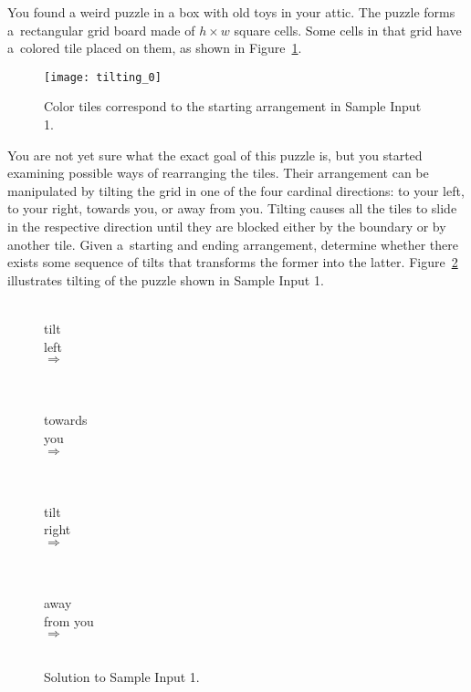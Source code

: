 
You found a weird puzzle in a box with old toys in your attic.
The puzzle forms a~rectangular grid board made of $h \times w$ square cells. 
Some cells in that grid have a~colored tile placed on them, as shown in Figure~\ref{fig:start}.

\begin{figure}[h]
\centering
\texttt{[image: tilting\_0]}
\caption{Color tiles correspond to the starting arrangement in Sample Input 1.}
\label{fig:start}
\end{figure}

You are not yet sure what the exact goal of this puzzle is, but you started examining possible ways of rearranging the tiles.
Their arrangement can be manipulated by tilting the grid in one of the four cardinal directions:
to your left, to your right, towards you, or away from you.
Tilting causes all the tiles to slide in the respective direction until they are blocked either by the boundary or by another tile.
Given a~starting and ending arrangement, determine whether there exists some sequence of tilts that transforms the former into the latter.
Figure~\ref{fig:tilt} illustrates tilting of the puzzle shown in Sample Input 1.

\begin{figure}[h]
\newcommand{\tiltfigln}{\vphantom{ly}\small}
\newlength{\tiltfigsp}\setlength{\tiltfigsp}{-4pt}
\centering
\parbox{0.4in}{\centering {\tiltfigln }\\[\tiltfigsp]{\tiltfigln tilt}\\[\tiltfigsp]{\tiltfigln left}\\$\Longrightarrow$\\~}
\parbox{0.5in}{\centering {\tiltfigln tilt}\\[\tiltfigsp]{\tiltfigln towards}\\[\tiltfigsp]{\tiltfigln you}\\$\Longrightarrow$\\~}
\parbox{0.4in}{\centering {\tiltfigln ~}\\[\tiltfigsp]{\tiltfigln tilt}\\[\tiltfigsp]{\tiltfigln right}\\$\Longrightarrow$\\~}
\parbox{0.55in}{\centering {\tiltfigln tilt}\\[\tiltfigsp]{\tiltfigln away}\\[\tiltfigsp]{\tiltfigln from you}\\$\Longrightarrow$\\~}
\caption{Solution to Sample Input 1.}
\label{fig:tilt}
\end{figure}


